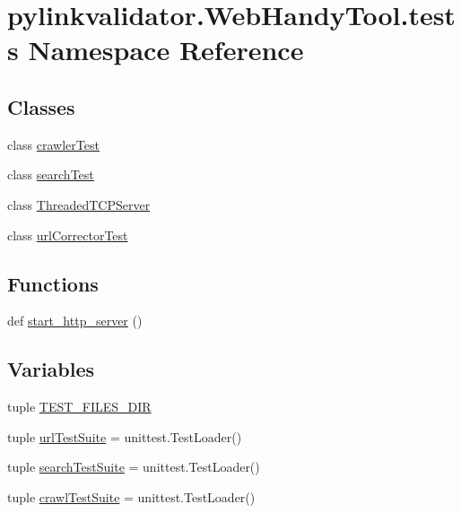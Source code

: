 \hypertarget{namespacepylinkvalidator_1_1_web_handy_tool_1_1tests}{}\section{pylinkvalidator.\+Web\+Handy\+Tool.\+tests Namespace Reference}
\label{namespacepylinkvalidator_1_1_web_handy_tool_1_1tests}
\subsection*{Classes}
\begin{DoxyCompactItemize}
\item 
class \hyperlink{classpylinkvalidator_1_1_web_handy_tool_1_1tests_1_1crawler_test}{crawler\+Test}
\item 
class \hyperlink{classpylinkvalidator_1_1_web_handy_tool_1_1tests_1_1search_test}{search\+Test}
\item 
class \hyperlink{classpylinkvalidator_1_1_web_handy_tool_1_1tests_1_1_threaded_t_c_p_server}{Threaded\+T\+C\+P\+Server}
\item 
class \hyperlink{classpylinkvalidator_1_1_web_handy_tool_1_1tests_1_1url_corrector_test}{url\+Corrector\+Test}
\end{DoxyCompactItemize}
\subsection*{Functions}
\begin{DoxyCompactItemize}
\item 
def \hyperlink{namespacepylinkvalidator_1_1_web_handy_tool_1_1tests_a9db60e3a111b5405bdfbc14fecaf488d}{start\+\_\+http\+\_\+server} ()
\end{DoxyCompactItemize}
\subsection*{Variables}
\begin{DoxyCompactItemize}
\item 
tuple \hyperlink{namespacepylinkvalidator_1_1_web_handy_tool_1_1tests_a14166a02e5bd8dca477698e70415a8dd}{T\+E\+S\+T\+\_\+\+F\+I\+L\+E\+S\+\_\+\+D\+IR}
\item 
tuple \hyperlink{namespacepylinkvalidator_1_1_web_handy_tool_1_1tests_acf8bf6dfdff5780f67938a68973a60c8}{url\+Test\+Suite} = unittest.\+Test\+Loader()
\item 
tuple \hyperlink{namespacepylinkvalidator_1_1_web_handy_tool_1_1tests_a2e5e49f77bf2a9ce392f59a9bee51808}{search\+Test\+Suite} = unittest.\+Test\+Loader()
\item 
tuple \hyperlink{namespacepylinkvalidator_1_1_web_handy_tool_1_1tests_a151ef06220ff5cd22210deb3f5c38a1f}{crawl\+Test\+Suite} = unittest.\+Test\+Loader()
\end{DoxyCompactItemize}


